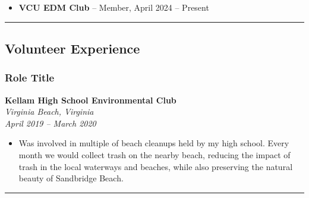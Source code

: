 \documentclass[
  letterpaper,
  DIV=11,
  numbers=noendperiod]{scrartcl}
\providecommand{\tightlist}{%
  \setlength{\itemsep}{0pt}\setlength{\parskip}{0pt}}\usepackage{longtable,booktabs,array}
\begin{document}
\begin{itemize}
\tightlist
\item
  \textbf{VCU EDM Club} -- Member, April 2024 -- Present
\end{itemize}

\begin{center}\rule{0.5\linewidth}{0.5pt}\end{center}

\subsection{Volunteer Experience}\label{volunteer-experience}

\subsubsection{Role Title}\label{role-title}

\textbf{Kellam High School Environmental Club}\\
\emph{Virginia Beach, Virginia}\\
\emph{April 2019 -- March 2020}

\begin{itemize}
\tightlist
\item
  Was involved in multiple of beach cleanups held by my high school.
  Every month we would collect trash on the nearby beach, reducing the
  impact of trash in the local waterways and beaches, while also
  preserving the natural beauty of Sandbridge Beach.
\end{itemize}

\begin{center}\rule{0.5\linewidth}{0.5pt}\end{center}
\end{document}
